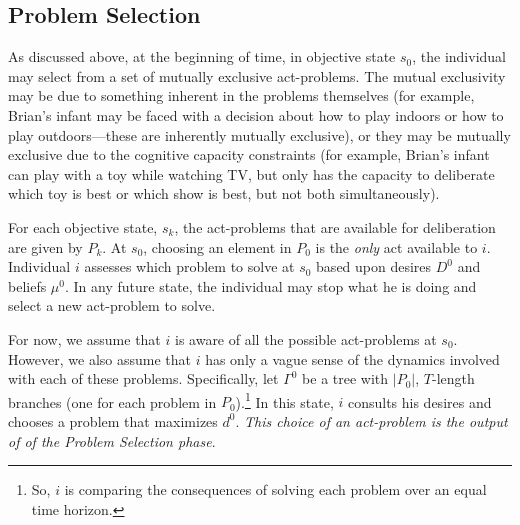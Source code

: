 \documentclass[
11pt,
titlepage,
reqno,
]{article}%
\theoremstyle{definition}
\begin{document}
\subsection{Problem Selection}

As discussed above, at the beginning of time, in objective state $s_0$, the individual may select from a set of mutually exclusive act-problems. 
The mutual exclusivity may be due to something inherent in the problems themselves (for example, Brian's infant may be faced with a decision about how to play indoors or how to play outdoors---these are inherently mutually exclusive), or they may be mutually exclusive due to the cognitive capacity constraints (for example, Brian's infant can play with a toy while watching TV, but only has the capacity to deliberate which toy is best or which show is best, but not both simultaneously).

For each objective state, $s_k$, the act-problems that are available for deliberation are given by $P_k$.
At $s_0$, choosing an element in $P_0$ is the \textit{only} act available to $i$.
Individual $i$ assesses which problem to solve at $s_0$ based upon desires $D^0$ and beliefs $\mu^0$.
In any future state, the individual may stop what he is doing and select a new act-problem to solve.

For now, we assume that $i$ is aware of all the possible act-problems at $s_0$.
However, we also assume that $i$ has only a vague sense of the dynamics involved with each of these problems.
Specifically, let $\Gamma^0$ be a tree with $|P_0|$, $T$-length branches (one for each problem in $P_0$).\footnote
{
	So, $i$ is comparing the consequences of solving each problem over an equal time horizon.
}
In this state, $i$ consults his desires and chooses a problem that maximizes $d^0$.
\textit{This choice of an act-problem is the output of of the Problem Selection phase}.
\end{document}
